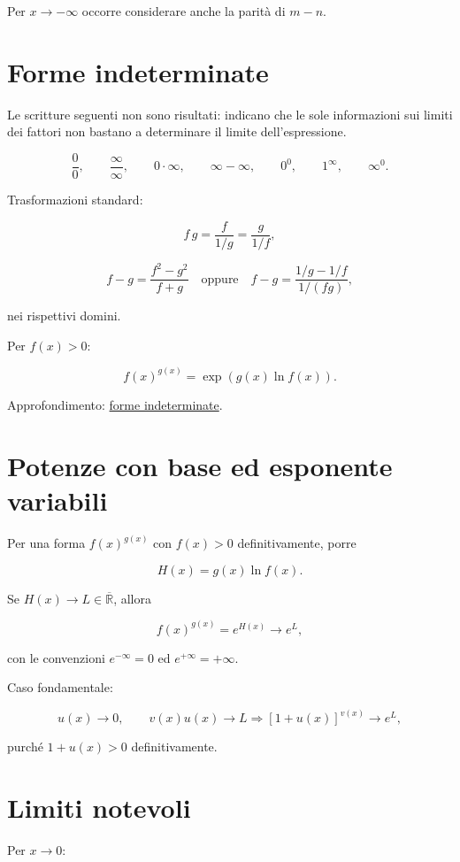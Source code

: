 Per \(x\to-\infty\) occorre considerare anche la parità di \(m-n\).

\section{Forme indeterminate}\label{forme-indeterminate}

Le scritture seguenti non sono risultati: indicano che le sole informazioni sui limiti dei fattori non bastano a determinare il limite dell'espressione.

\[
\frac00,
\qquad
\frac\infty\infty,
\qquad
0\cdot\infty,
\qquad
\infty-\infty,
\qquad
0^0,
\qquad
1^\infty,
\qquad
\infty^0.
\]

Trasformazioni standard:

\[
f\,g=\frac f{1/g}=\frac g{1/f},
\]

\[
f-g=\frac{f^2-g^2}{f+g}
\quad\text{oppure}\quad
f-g=\frac{1/g-1/f}{1/(fg)},
\]

nei rispettivi domini.

Per \(f(x)>0\):

\[
f(x)^{g(x)}
=\exp(g(x)\ln f(x)).
\]

Approfondimento: \href{https://ingegnerismo.it/matematica/forme-indeterminate/}{forme indeterminate}.

\section{Potenze con base ed esponente variabili}\label{potenze-con-base-ed-esponente-variabili}

Per una forma \(f(x)^{g(x)}\) con \(f(x)>0\) definitivamente, porre

\[
H(x)=g(x)\ln f(x).
\]

Se \(H(x)\to L\in\overline{\mathbb R}\), allora

\[
f(x)^{g(x)}=e^{H(x)}\to e^L,
\]

con le convenzioni \(e^{-\infty}=0\) ed \(e^{+\infty}=+\infty\).

Caso fondamentale:

\[
u(x)\to0,
\qquad
v(x)u(x)\to L
\Longrightarrow
[1+u(x)]^{v(x)}\to e^L,
\]

purché \(1+u(x)>0\) definitivamente.

\section{Limiti notevoli}\label{limiti-notevoli}

Per \(x\to0\):

